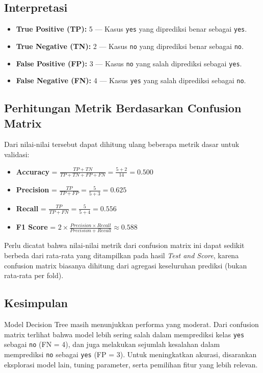 \subsection*{Interpretasi}

\begin{itemize}
	\item \textbf{True Positive (TP):} 5 — Kasus \texttt{yes} yang diprediksi benar sebagai \texttt{yes}.
	\item \textbf{True Negative (TN):} 2 — Kasus \texttt{no} yang diprediksi benar sebagai \texttt{no}.
	\item \textbf{False Positive (FP):} 3 — Kasus \texttt{no} yang salah diprediksi sebagai \texttt{yes}.
	\item \textbf{False Negative (FN):} 4 — Kasus \texttt{yes} yang salah diprediksi sebagai \texttt{no}.
\end{itemize}

\subsection*{Perhitungan Metrik Berdasarkan Confusion Matrix}

Dari nilai-nilai tersebut dapat dihitung ulang beberapa metrik dasar untuk validasi:

\begin{itemize}
	\item \textbf{Accuracy} = \( \frac{TP + TN}{TP + TN + FP + FN} = \frac{5 + 2}{14} = 0.500 \)
	\item \textbf{Precision} = \( \frac{TP}{TP + FP} = \frac{5}{5 + 3} = 0.625 \)
	\item \textbf{Recall} = \( \frac{TP}{TP + FN} = \frac{5}{5 + 4} = 0.556 \)
	\item \textbf{F1 Score} = \( 2 \times \frac{Precision \times Recall}{Precision + Recall} \approx 0.588 \)
\end{itemize}

Perlu dicatat bahwa nilai-nilai metrik dari confusion matrix ini dapat sedikit berbeda dari rata-rata yang ditampilkan pada hasil \textit{Test and Score}, karena confusion matrix biasanya dihitung dari agregasi keseluruhan prediksi (bukan rata-rata per fold).

\subsection*{Kesimpulan}

Model Decision Tree masih menunjukkan performa yang moderat. Dari confusion matrix terlihat bahwa model lebih sering salah dalam memprediksi kelas \texttt{yes} sebagai \texttt{no} (FN = 4), dan juga melakukan sejumlah kesalahan dalam memprediksi \texttt{no} sebagai \texttt{yes} (FP = 3). Untuk meningkatkan akurasi, disarankan eksplorasi model lain, tuning parameter, serta pemilihan fitur yang lebih relevan.


